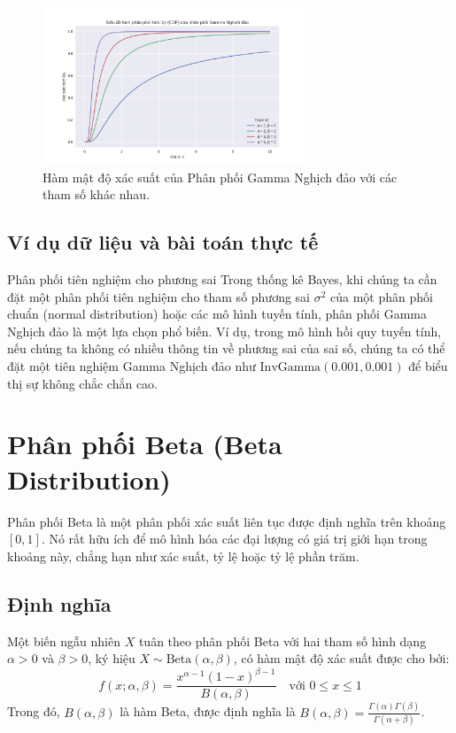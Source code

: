 		\begin{figure}[h!]
		\centering
		\includegraphics[width=0.7\textwidth]{images/Inverse Gamma Distribution-CDF.png} %
		\caption{Hàm mật độ xác suất của Phân phối Gamma Nghịch đảo với các tham số khác nhau.}
		\label{fig:Inverse Gamma Distribution-CDF}
	\end{figure}
	
	\subsection{Ví dụ dữ liệu và bài toán thực tế}
		Phân phối tiên nghiệm cho phương sai
		Trong thống kê Bayes, khi chúng ta cần đặt một phân phối tiên nghiệm cho tham số phương sai $\sigma^2$ của một phân phối chuẩn (normal distribution) hoặc các mô hình tuyến tính, phân phối Gamma Nghịch đảo là một lựa chọn phổ biến. Ví dụ, trong mô hình hồi quy tuyến tính, nếu chúng ta không có nhiều thông tin về phương sai của sai số, chúng ta có thể đặt một tiên nghiệm Gamma Nghịch đảo như $\text{InvGamma}(0.001, 0.001)$ để biểu thị sự không chắc chắn cao.
	
\section{Phân phối Beta (Beta Distribution)}
	Phân phối Beta là một phân phối xác suất liên tục được định nghĩa trên khoảng $[0, 1]$. Nó rất hữu ích để mô hình hóa các đại lượng có giá trị giới hạn trong khoảng này, chẳng hạn như xác suất, tỷ lệ hoặc tỷ lệ phần trăm.
	
	
	\subsection{Định nghĩa}
		Một biến ngẫu nhiên $X$ tuân theo phân phối Beta với hai tham số hình dạng $\alpha > 0$ và $\beta > 0$, ký hiệu $X \sim \text{Beta}(\alpha, \beta)$, có hàm mật độ xác suất được cho bởi:
		\[ f(x; \alpha, \beta) = \frac{x^{\alpha-1}(1-x)^{\beta-1}}{B(\alpha, \beta)} \quad \text{với } 0 \le x \le 1 \]
		Trong đó, $B(\alpha, \beta)$ là hàm Beta, được định nghĩa là $B(\alpha, \beta) = \frac{\Gamma(\alpha)\Gamma(\beta)}{\Gamma(\alpha+\beta)}$.
	
